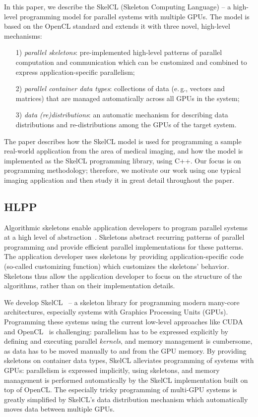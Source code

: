 In this paper, we describe the SkelCL (Skeleton Computing Language) -- a high-level programming model for parallel systems with multiple GPUs.
The model is based on the OpenCL standard and extends it with three novel, high-level mechanisms:
\begin{itemize}
  \item[1)] \emph{parallel skeletons}: pre-implemented high-level patterns of parallel computation and communication which can be customized and combined to express application-specific parallelism;
  \item[2)] \emph{parallel container data types}: collections of data (e.\,g., vectors and matrices) that are managed automatically across all GPUs in the system;
  \item[3)] \emph{data (re)distributions}: an automatic mechanism for describing data distributions and re-distributions among the GPUs of the target system.
\end{itemize}

The paper describes how the SkelCL model is used for programming a sample real-world application from the area of medical imaging, and how the model is implemented as the SkelCL programming library, using C++.
Our focus is on programming methodology;
therefore, we motivate our work using one typical imaging application and then study it in great detail throughout the paper.

\subsection{HLPP}
Algorithmic skeletons enable application developers to program parallel systems at a high level of abstraction~\cite{Cole-04}.
Skeletons abstract recurring patterns of parallel programming and provide efficient parallel implementations for these patterns.
The application developer uses skeletons by providing application-specific code (so-called customizing function) which customizes the skeletons' behavior.
Skeletons thus allow the application developer to focus on the structure of the algorithms, rather than on their implementation details.

We develop SkelCL~\cite{StKG-12} -- a skeleton library for programming modern many-core architectures, especially systems with Graphics Processing Units (GPUs).
Programming these systems using the current low-level approaches like CUDA~\cite{NVIDIA-12} and OpenCL~\cite{OpenCL1.2} is challenging: parallelism has to be expressed explicitly by defining and executing parallel \emph{kernels}, and memory management is cumbersome, as data has to be moved manually to and from the GPU memory.
By providing skeletons on container data types, SkelCL alleviates programming of systems with GPUs:
parallelism is expressed implicitly, using skeletons, and memory management is performed automatically by the SkelCL implementation built on top of OpenCL.
The especially tricky programming of multi-GPU systems is greatly simplified by SkelCL's data distribution mechanism which automatically moves data between multiple GPUs.

